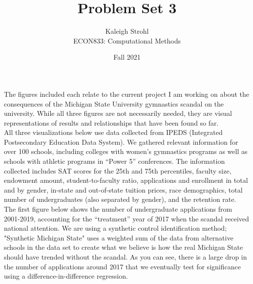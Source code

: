 \documentclass[a4paper,12pt]{article}
\begin{document}
\title{Problem Set 3}
\author{Kaleigh Strohl \\
ECON833: Computational Methods}
\date{Fall 2021}
\maketitle

\noindent The figures included each relate to the current project I am working on about the consequences of the Michigan State University gymnastics scandal on the university. While all three figures are not necessarily needed, they are visual representations of results and relationships that have been found so far. \\

\noindent All three visualizations below use data collected from IPEDS (Integrated Postsecondary Education Data System). We gathered relevant information for over 100 schools, including colleges with women's gymnastics programs as well as schools with athletic programs in \enquote{Power 5} conferences. The information collected includes SAT scores for the 25th and 75th percentiles, faculty size, endowment amount, student-to-faculty ratio, applications and enrollment in total and by gender, in-state and out-of-state tuition prices, race demographics, total number of undergraduates (also separated by gender), and the retention rate. \\

\noindent The first figure below shows the number of undergraduate applications from 2001-2019, accounting for the \enquote{treatment} year of 2017 when the scandal received national attention. We are using a synthetic control identification method; "Synthetic Michigan State" uses a weighted sum of the data from alternative schools in the data set to create what we believe is how the real Michigan State should have trended without the scandal. As you can see, there is a large drop in the number of applications around 2017 that we eventually test for significance using a difference-in-difference regression. 
\end{document}
